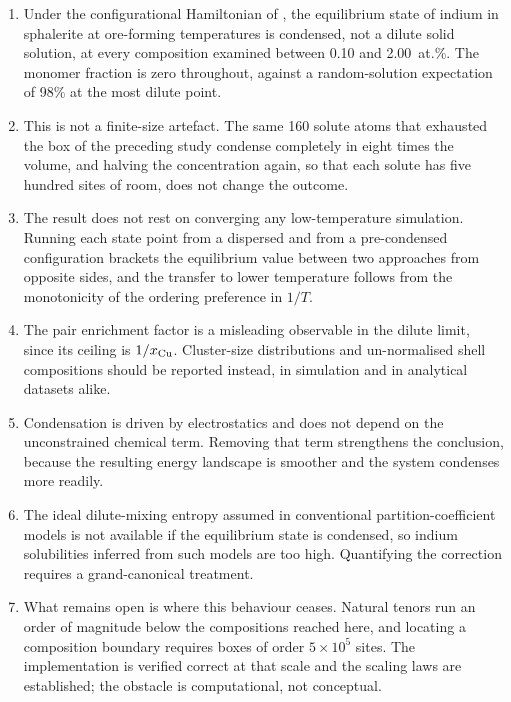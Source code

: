 \documentclass[11pt,a4paper]{article}
\begin{document}
\begin{enumerate}\itemsep3pt
\item Under the configurational Hamiltonian of \citet{yu2026}, the equilibrium
      state of indium in sphalerite at ore-forming temperatures is condensed,
      not a dilute solid solution, at every composition examined between 0.10
      and 2.00~at.\%. The monomer fraction is zero throughout, against a
      random-solution expectation of 98\% at the most dilute point.

\item This is not a finite-size artefact. The same 160 solute atoms that
      exhausted the box of the preceding study condense completely in eight
      times the volume, and halving the concentration again, so that each solute
      has five hundred sites of room, does not change the outcome.

\item The result does not rest on converging any low-temperature simulation.
      Running each state point from a dispersed and from a pre-condensed
      configuration brackets the equilibrium value between two approaches from
      opposite sides, and the transfer to lower temperature follows from the
      monotonicity of the ordering preference in $1/T$.

\item The pair enrichment factor is a misleading observable in the dilute limit,
      since its ceiling is $1/x_{\rm Cu}$. Cluster-size distributions and
      un-normalised shell compositions should be reported instead, in simulation
      and in analytical datasets alike.

\item Condensation is driven by electrostatics and does not depend on the
      unconstrained chemical term. Removing that term strengthens the conclusion,
      because the resulting energy landscape is smoother and the system condenses
      more readily.

\item The ideal dilute-mixing entropy assumed in conventional
      partition-coefficient models is not available if the equilibrium state is
      condensed, so indium solubilities inferred from such models are too high.
      Quantifying the correction requires a grand-canonical treatment.

\item What remains open is where this behaviour ceases. Natural tenors run an
      order of magnitude below the compositions reached here, and locating a
      composition boundary requires boxes of order $5\times10^5$ sites. The
      implementation is verified correct at that scale and the scaling laws are
      established; the obstacle is computational, not conceptual.
\end{enumerate}
\end{document}
